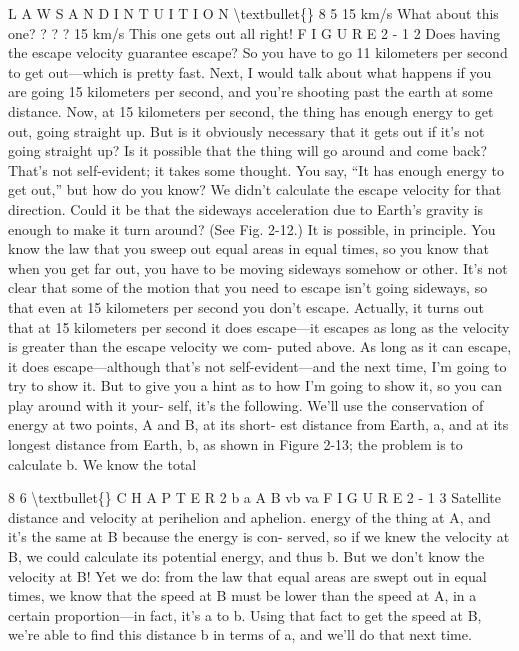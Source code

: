 \documentclass[10pt,oneside]{article}
\begin{document}
L A W S  A N D  I N T U I T I O N \textbackslash{}textbullet\{\} 8 5 15 km/s What about this one? ? ? ? 15 km/s This one gets out all right! F I G U R E  2 - 1 2 Does having the escape velocity guarantee escape? So you have to go 11 kilometers per second to get out---which is pretty fast. Next, I would talk about what happens if you are going 15 kilometers per second, and you’re shooting past the earth at some distance. Now, at 15 kilometers per second, the thing has enough energy to get out, going straight up. But is it obviously necessary that it gets out if it’s not going straight up? Is it possible that the thing will go around and come back? That’s not self-evident; it takes some thought. You say, “It has enough energy to get out,” but how do you know? We didn’t calculate the escape velocity for that direction. Could it be that the sideways acceleration due to Earth’s gravity is enough to make it turn around? (See Fig. 2-12.) It is possible, in principle. You know the law that you sweep out equal areas in equal times, so you know that when you get far out, you have to be moving sideways somehow or other. It’s not clear that some of the motion that you need to escape isn’t going sideways, so that even at 15 kilometers per second you don’t escape. Actually, it turns out that at 15 kilometers per second it does escape---it escapes as long as the velocity is greater than the escape velocity we com- puted above. As long as it can escape, it does escape---although that’s not self-evident---and the next time, I’m going to try to show it. But to give you a hint as to how I’m going to show it, so you can play around with it your- self, it’s the following. We’ll use the conservation of energy at two points, A and B, at its short- est distance from Earth, a, and at its longest distance from Earth, b, as shown in Figure 2-13; the problem is to calculate b. We know the total\par

8 6 \textbackslash{}textbullet\{\} C H A P T E R  2 b a A B vb va F I G U R E  2 - 1 3 Satellite distance and velocity at perihelion and aphelion. energy of the thing at A, and it’s the same at B because the energy is con- served, so if we knew the velocity at B, we could calculate its potential energy, and thus b. But we don’t know the velocity at B! Yet we do: from the law that equal areas are swept out in equal times, we know that the speed at B must be lower than the speed at A, in a certain proportion---in fact, it’s a to b. Using that fact to get the speed at B, we’re able to find this distance b in terms of a, and we’ll do that next time.\par
\end{document}
